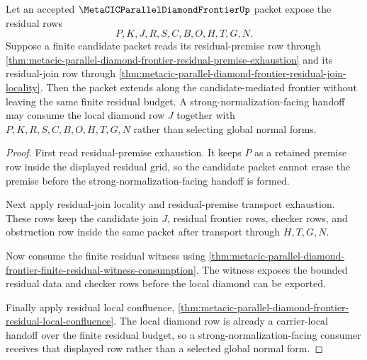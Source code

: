 \begin{theorem}
\label{thm:metacic-parallel-diamond-frontier-candidate-mediated-sn-extension}
Let an accepted $\MetaCICParallelDiamondFrontierUp$ packet expose the residual rows
$$
P,K,J,R,S,C,B,O,H,T,G,N .
$$
Suppose a finite candidate packet reads its residual-premise row through \autoref{thm:metacic-parallel-diamond-frontier-residual-premise-exhaustion} and its residual-join row through \autoref{thm:metacic-parallel-diamond-frontier-residual-join-locality}. Then the packet extends along the candidate-mediated frontier without leaving the same finite residual budget. A strong-normalization-facing handoff may consume the local diamond row $J$ together with $P,K,R,S,C,B,O,H,T,G,N$ rather than selecting global normal forms.
\end{theorem}
\begin{proof}
First read residual-premise exhaustion. It keeps $P$ as a retained premise row inside the displayed residual grid, so the candidate packet cannot erase the premise before the strong-normalization-facing handoff is formed.

Next apply residual-join locality and residual-premise transport exhaustion. These rows keep the candidate join $J$, residual frontier rows, checker rows, and obstruction row inside the same packet after transport through $H,T,G,N$.

Now consume the finite residual witness using \autoref{thm:metacic-parallel-diamond-frontier-finite-residual-witness-consumption}. The witness exposes the bounded residual data and checker rows before the local diamond can be exported.

Finally apply residual local confluence, \autoref{thm:metacic-parallel-diamond-frontier-residual-local-confluence}. The local diamond row is already a carrier-local handoff over the finite residual budget, so a strong-normalization-facing consumer receives that displayed row rather than a selected global normal form.
\end{proof}

